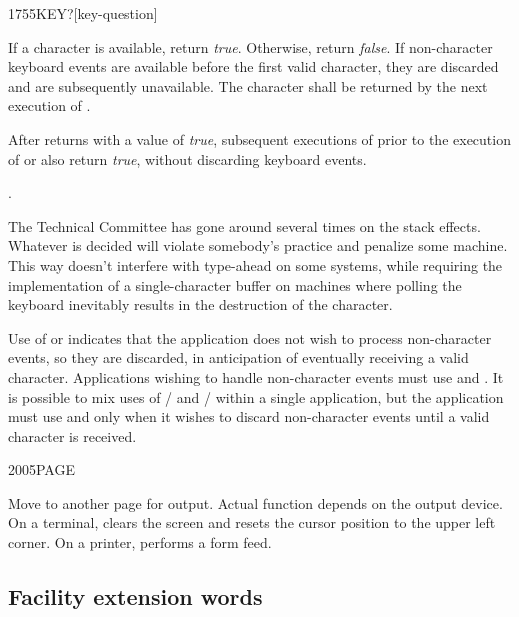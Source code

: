 \begin{worddef}[KEYq]{1755}{KEY?}[key-question]
\item {}

	If a character is available, return \emph{true}. Otherwise,
	return \emph{false}. If non-character keyboard events are
	available before the first valid character, they are discarded
	and are subsequently unavailable. The character shall be
	returned by the next execution of .

	After  returns with a value of \emph{true},
	subsequent executions of  prior to the execution
	of  or  also return \emph{true},
	without discarding keyboard events.

\see {}.

	\begin{rationale} %
		The Technical Committee has gone around several times on the
		stack effects. Whatever is decided will violate somebody's
		practice and penalize some machine. This way doesn't interfere
		with type-ahead on some systems, while requiring the
		implementation of a single-character buffer on machines where
		polling the keyboard inevitably results in the destruction of
		the character.

		Use of  or  indicates that the
		application does not wish to process non-character events,
		so they are discarded, in anticipation of eventually receiving
		a valid character. Applications wishing to handle non-character
		events must use  and . It is possible
		to mix uses of / and
		/ within a single application, but
		the application must use  and  only
		when it wishes to discard non-character events until a valid
		character is received.
	\end{rationale}
\end{worddef}


\begin{worddef}{2005}{PAGE}
\item \stack{}{}

	Move to another page for output. Actual function depends on the
	output device. On a terminal,  clears the screen and
	resets the cursor position to the upper left corner. On a
	printer,  performs a form feed.
\end{worddef}


\subsection{Facility extension words} %
\extended

